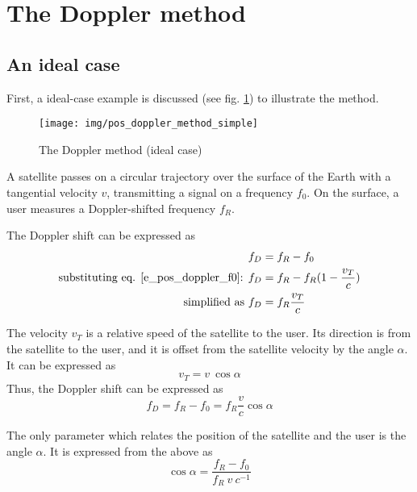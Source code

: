 \section{The Doppler method}
 

\subsection{An ideal case}
First, a ideal-case example is discussed (see fig. \ref{f_pos_doppler_method_simple}) to illustrate the method.

\begin{figure}
    \centering
    \texttt{[image: img/pos\_doppler\_method\_simple]}
    \caption{The Doppler method (ideal case)}
    \label{f_pos_doppler_method_simple}
\end{figure}

A satellite passes on a circular trajectory over the surface of the Earth with a tangential velocity $v$, transmitting a signal on a frequency $f_0$. On the surface, a user measures a Doppler-shifted frequency $f_R$.

The Doppler shift can be expressed as
\begin{align*}
    f_D &= f_R - f_0 \\
    \textnormal{substituting eq. \ref{e_pos_doppler_f0}: } 
    f_D &= f_R - f_R (1 - \frac{v_T}{c}) \\
    \textnormal{simplified as } 
    f_D &= f_R \frac{v_T}{c}
\end{align*}

The velocity $v_T$ is a relative speed of the satellite to the user. Its direction is from the satellite to the user, and it is offset from the satellite velocity by the angle $\alpha$. It can be expressed as
\begin{equation*}
    v_T = v \ \cos{\alpha}
\end{equation*}
Thus, the Doppler shift can be expressed as
\begin{equation}
    \label{e_pos_fd}
    f_D = f_R - f_0 = f_R \frac{v}{c} \cos{\alpha}
\end{equation}

The only parameter which relates the position of the satellite and the user is the angle $\alpha$. It is expressed from the above as
\begin{equation}
    \label{e_pos_cos_alpha}
    \cos{\alpha} = \frac{f_R - f_0}{f_R \ v \ c^{-1}}
\end{equation}

